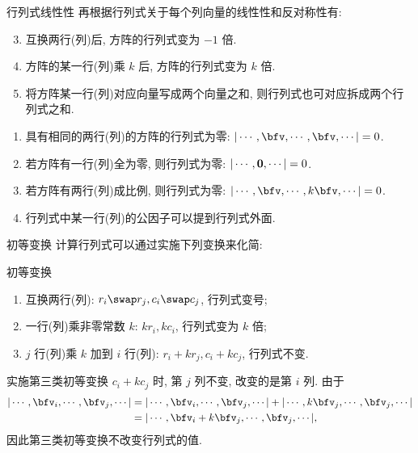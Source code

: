 \begin{frame}{行列式线性性}
	\onslide<+->
	再根据行列式关于每个列向量的线性性和反对称性有:
	\onslide<+->
	\begin{second@}
		\begin{enumerate}
			\setcounter{enumi}{2}
			\item 互换两行(列)后, 方阵的行列式变为 $-1$ 倍.
			\item 方阵的某一行(列)乘 $k$ 后, 方阵的行列式变为 $k$ 倍.
			\item 将方阵某一行(列)对应向量写成两个向量之和, 则行列式也可对应拆成两个行列式之和.
		\end{enumerate}
	\end{second@}
	\onslide<+->
	\begin{corollary}
		\begin{enumerate}
			\item 具有相同的两行(列)的方阵的行列式为零: $|\cdots,\bfv,\cdots,\bfv,\cdots|=0$.
			\item 若方阵有一行(列)全为零, 则行列式为零: $|\cdots,{\bf0},\cdots|=0$.
			\item 若方阵有两行(列)成比例, 则行列式为零: $|\cdots,\bfv,\cdots,k\bfv,\cdots|=0$.
			\item 行列式中某一行(列)的公因子可以提到行列式外面.
		\end{enumerate}
	\end{corollary}
\end{frame}


\begin{frame}{初等变换}
	\onslide<+->
	计算行列式可以通过实施下列变换来化简:
	\onslide<+->
	\begin{third}{初等变换}
		\begin{enumerate}
			\item 互换两行(列): \alert{$r_i\swap r_j, c_i\swap c_j$}, 行列式变号;
			\item 一行(列)乘\alert{非零常数} $k$: \alert{$kr_i, kc_i$}, 行列式变为 $k$ 倍;
			\item $j$ 行(列)乘 $k$ 加到 $i$ 行(列): \alert{$r_i+kr_j, c_i+kc_j$}, 行列式不变.
		\end{enumerate}
	\end{third}
	\onslide<+->
	实施第三类初等变换 $c_i+kc_j$ 时, 第 $j$ 列不变, 改变的是第 $i$ 列.
	\onslide<+->
	由于
	\begin{align*}
		|\cdots,\bfv_i,\cdots,\bfv_j,\cdots|
		&=|\cdots,\bfv_i,\cdots,\bfv_j,\cdots|
		+|\cdots,k\bfv_j,\cdots,\bfv_j,\cdots|\\
		&=|\cdots,\bfv_i+k\bfv_j,\cdots,\bfv_j,\cdots|,
	\end{align*}
	\onslide<+->
	因此第三类初等变换不改变行列式的值.
\end{frame}



